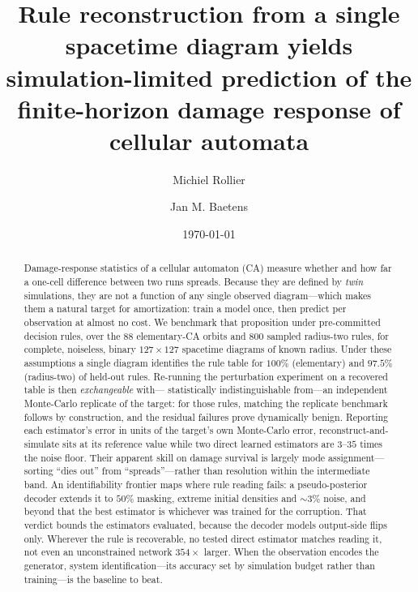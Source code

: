 \documentclass[aip,cha,amsmath,amssymb,reprint,floatfix]{revtex4-2}
\begin{document}
\title{Rule reconstruction from a single spacetime diagram yields
simulation-limited prediction of the finite-horizon damage response of cellular
automata}

\author{Michiel Rollier}
\author{Jan M. Baetens}

\date{\today}

\begin{abstract}
Damage-response statistics of a cellular automaton (CA) measure whether and
how far a one-cell difference between two runs spreads. Because they are
defined by \emph{twin} simulations, they are not a function of any single
observed diagram---which makes them a natural target for
amortization: train a model once, then
predict per observation at almost no cost. We benchmark that proposition
under pre-committed decision rules, over the $88$ elementary-CA orbits and
$800$ sampled radius-two rules, for complete, noiseless, binary
$127\times127$ spacetime diagrams of known radius. Under these assumptions
a single diagram identifies the rule table for $100\%$ (elementary) and
$97.5\%$ (radius-two) of held-out rules. Re-running the perturbation
experiment on a recovered table is then \emph{exchangeable} with---%
statistically indistinguishable from---an independent Monte-Carlo replicate
of the target: for those rules, matching the replicate benchmark follows by
construction, and the residual failures prove dynamically benign. Reporting each
estimator's error in units of the target's own Monte-Carlo error,
reconstruct-and-simulate sits at its reference value while two direct
learned estimators are $3$--$35$ times the noise floor. Their apparent
skill on damage survival is largely mode assignment---sorting ``dies out''
from ``spreads''---rather than resolution within the intermediate band. An
identifiability frontier maps where rule reading fails: a pseudo-posterior
decoder extends it to $50\%$ masking, extreme initial densities and
${\sim}3\%$ noise, and beyond that the best estimator is whichever was
trained for the corruption. That verdict bounds the estimators evaluated,
because the decoder models output-side flips only. Wherever the rule is
recoverable, no tested direct estimator matches reading it, not even an
unconstrained network $354\times$ larger. When the observation encodes the
generator, system identification---its accuracy set by simulation budget
rather than training---is the baseline to beat.
\end{abstract}
\end{document}
